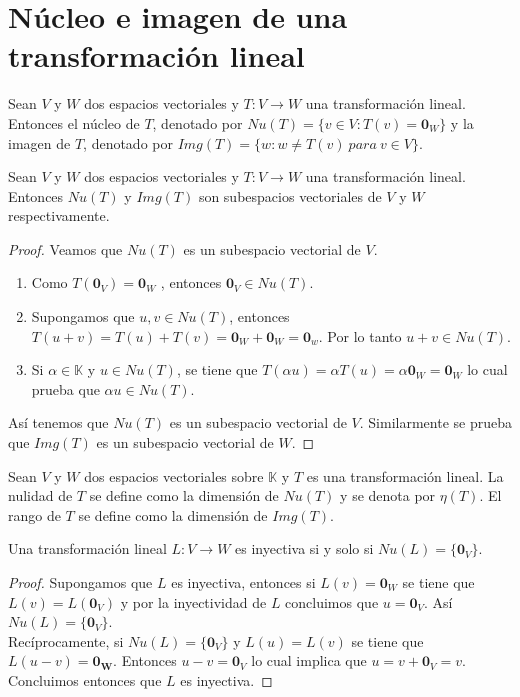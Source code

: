 \section{Núcleo e imagen de una transformación lineal}
\begin{dfn}
Sean $V$ y $W$ dos espacios vectoriales y $T : V \to W$ una transformación lineal. Entonces el núcleo de $T$, denotado por $Nu(T) = \{v \in V : T(v) = \mathbf{0}_W\}$ y la imagen de $T$, denotado por $Img(T) = \{w : w \neq T(v) \ para \ v \in V\}$.
\end{dfn}

\begin{theorem}
Sean $V$ y $W$ dos espacios vectoriales y $T : V \to W$ una transformación lineal. Entonces $Nu(T)$ y $Img(T)$ son subespacios vectoriales de $V$ y $W$ respectivamente.
\end{theorem}

\begin{proof}
Veamos que $Nu(T)$ es un subespacio vectorial de $V$.
\begin{enumerate}
\item Como $T(\mathbf{0}_V)=\mathbf{0}_W$ , entonces $\mathbf{0}_V \in Nu(T)$.
\item Supongamos que $u , v \in Nu(T)$, entonces $T(u+v) = T(u) + T(v) = \mathbf{0}_W + \mathbf{0}_W = \mathbf{0}_w$. Por lo tanto $u+v \in Nu(T)$.
\item Si $\alpha \in \mathbb{K}$ y $u \in Nu(T)$, se tiene que $T(\alpha u) = \alpha T(u) = \alpha \mathbf{0}_W = \mathbf{0}_W$ lo cual prueba que $\alpha u \in Nu(T)$.
\end{enumerate}
Así tenemos que $Nu(T)$ es un subespacio vectorial de $V$. Similarmente se prueba que $Img(T)$ es un subespacio vectorial de $W$.
\end{proof}

\begin{dfn}
Sean $V$ y $W$ dos espacios vectoriales sobre $\mathbb{K}$ y $T$ es una transformación lineal. La nulidad de $T$ se define como la dimensión de $Nu(T)$ y se denota por $\eta (T)$. El rango de $T$ se define como la dimensión de $Img(T)$.
\end{dfn}

\begin{theorem}
Una transformación lineal $L : V \to W$ es inyectiva si y solo si $Nu(L) = \{\mathbf{0}_V\}$.
\end{theorem}

\begin{proof}
Supongamos que $L$ es inyectiva, entonces si $L(v) = \mathbf{0}_W$ se tiene que $L(v) = L(\mathbf{0}_V)$ y por la inyectividad de $L$ concluimos que $u = \mathbf{0}_V$. Así $Nu(L) = \{\mathbf{0}_V\}$.\\
Recíprocamente, si $Nu(L) = \{\mathbf{0}_V\}$ y $L(u) = L(v)$ se tiene que $L(u - v) = \mathbf{0_W}$. Entonces $u -v = \mathbf{0}_V$ lo cual implica que $u = v + \mathbf{0}_V = v$. Concluimos entonces que $L$ es inyectiva.
\end{proof}

